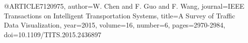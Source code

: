 @ARTICLE{7120975,
  author={W. {Chen} and F. {Guo} and F. {Wang}},
  journal={IEEE Transactions on Intelligent Transportation Systems}, 
  title={A Survey of Traffic Data Visualization}, 
  year={2015},
  volume={16},
  number={6},
  pages={2970-2984},
  doi={10.1109/TITS.2015.2436897}}